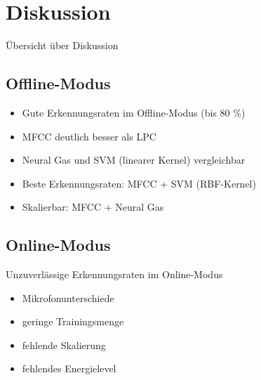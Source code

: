 \chapter{Diskussion}
Übersicht über Diskussion

\section{Offline-Modus}
\begin{itemize}
	\item Gute Erkennungsraten im Offline-Modus (bis 80 \%)
	\item MFCC deutlich besser als LPC
	\item Neural Gas und SVM (linearer Kernel) vergleichbar
	\item Beste Erkennungsraten: MFCC + SVM (RBF-Kernel)
	\item Skalierbar: MFCC + Neural Gas
\end{itemize}

\section{Online-Modus}
Unzuverlässige Erkennungsraten im Online-Modus
\begin{itemize}
	\item Mikrofonunterschiede
	\item geringe Trainingsmenge
	\item fehlende Skalierung
	\item fehlendes Energielevel
\end{itemize}
